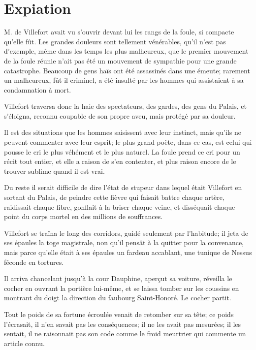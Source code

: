 \chapter{Expiation} 

\lettrine{M}{.} de Villefort avait vu s'ouvrir devant lui les rangs de la foule, si compacte qu'elle fût. Les grandes douleurs sont tellement vénérables, qu'il n'est pas d'exemple, même dans les temps les plus malheureux, que le premier mouvement de la foule réunie n'ait pas été un mouvement de sympathie pour une grande catastrophe. Beaucoup de gens haïs ont été assassinés dans une émeute; rarement un malheureux, fût-il criminel, a été insulté par les hommes qui assistaient à sa condamnation à mort. 

Villefort traversa donc la haie des spectateurs, des gardes, des gens du Palais, et s'éloigna, reconnu coupable de son propre aveu, mais protégé par sa douleur. 

Il est des situations que les hommes saisissent avec leur instinct, mais qu'ils ne peuvent commenter avec leur esprit; le plus grand poète, dans ce cas, est celui qui pousse le cri le plus véhément et le plus naturel. La foule prend ce cri pour un récit tout entier, et elle a raison de s'en contenter, et plus raison encore de le trouver sublime quand il est vrai. 

Du reste il serait difficile de dire l'état de stupeur dans lequel était Villefort en sortant du Palais, de peindre cette fièvre qui faisait battre chaque artère, raidissait chaque fibre, gonflait à la briser chaque veine, et disséquait chaque point du corps mortel en des millions de souffrances. 

Villefort se traîna le long des corridors, guidé seulement par l'habitude; il jeta de ses épaules la toge magistrale, non qu'il pensât à la quitter pour la convenance, mais parce qu'elle était à ses épaules un fardeau accablant, une tunique de Nessus féconde en tortures. 

Il arriva chancelant jusqu'à la cour Dauphine, aperçut sa voiture, réveilla le cocher en ouvrant la portière lui-même, et se laissa tomber sur les coussins en montrant du doigt la direction du faubourg Saint-Honoré. Le cocher partit. 

Tout le poids de sa fortune écroulée venait de retomber sur sa tête; ce poids l'écrasait, il n'en savait pas les conséquences; il ne les avait pas mesurées; il les sentait, il ne raisonnait pas son code comme le froid meurtrier qui commente un article connu. 

